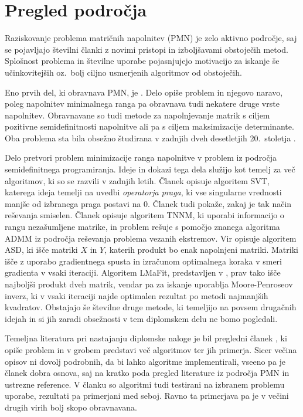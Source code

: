 \chapter{Pregled področja} \label{1407-1010}

Raziskovanje problema matričnih napolnitev (PMN) je zelo aktivno področje, saj se pojavljajo številni članki z novimi pristopi in izboljšavami obstoječih metod.  Splošnost problema in številne uporabe pojasnjujejo motivacijo za iskanje še učinkovitejših oz.\ bolj ciljno usmerjenih algoritmov od obstoječih.

Eno prvih del, ki obravnava PMN, je \cite{MCPAS}. Delo opiše problem in njegovo naravo, poleg napolnitev minimalnega ranga pa obravnava tudi nekatere druge vrste napolnitev. Obravnavane so tudi metode za napolnjevanje matrik s ciljem pozitivne semidefinitnosti napolnitve ali pa s ciljem maksimizacije determinante. Oba problema sta bila obsežno študirana v zadnjih dveh desetletjih 20.\ stoletja \cite{Barret, Dancis,Woerdeman}.

Delo \cite{NNM-PHD} pretvori problem minimizacije ranga napolnitve v problem iz področja semidefinitnega programiranja. Ideje in dokazi tega dela služijo kot temelj za več algoritmov, ki so se razvili v zadnjih letih.
Članek \cite{CCS} opisuje algoritem SVT, katerega ideja temelji na uvedbi \textit{operatorja praga}, ki vse singularne vrednosti manjše od izbranega praga postavi na 0. Članek tudi pokaže, zakaj je tak način reševanja smiselen.
Članek \cite{TNNM-HZYLH12} opisuje algoritem TNNM, ki uporabi informacijo o rangu nezašumljene matrike, in problem rešuje s pomočjo znanega algoritma ADMM \cite{admmForNNM} iz področja reševanja problema vezanih ekstremov. 
Vir \cite{AST-TK15} opisuje algoritem ASD, ki išče matriki $X$ in $Y$, katerih produkt bo enak napolnjeni matriki. Matriki išče z uporabo gradientnega spusta in izračunom optimalnega koraka v smeri gradienta v vsaki iteraciji.  
Algoritem LMaFit, predstavljen v \cite{LMaFit-WY12}, prav tako išče najboljši produkt dveh matrik, vendar pa za iskanje uporablja Moore-Penroseov inverz, ki v vsaki iteraciji najde optimalen rezultat po metodi najmanjših kvadratov.
Obstajajo še številne druge metode, ki temeljijo na povsem drugačnih idejah \cite{admira,Riemannian,SETalgo} in si jih zaradi obsežnosti v tem diplomskem delu ne bomo pogledali. 


Temeljna literatura pri nastajanju diplomske naloge je bil pregledni članek \cite{Survey-NKS19}, ki opiše problem in v grobem predstavi več algoritmov ter jih primerja. Sicer večina opisov ni dovolj podrobnih, da bi lahko algoritme implementirali, vseeno pa je  članek dobra osnova, saj na kratko poda pregled literature iz področja PMN in ustrezne reference. V članku so algoritmi tudi testirani na izbranem problemu uporabe,
rezultati pa primerjani med seboj. Ravno ta primerjava pa je v večini drugih virih bolj skopo obravnavana.

